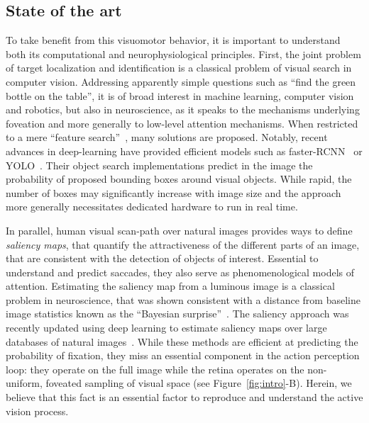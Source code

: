 %
\subsection*{State of the art}

To take benefit from this visuomotor behavior, it is important to understand both its computational and neurophysiological principles. First, the joint problem of target localization and identification is a classical problem of visual search in computer vision. Addressing apparently simple questions such as ``find the green bottle on the table'', it is of broad interest in machine learning, computer vision and robotics, but also in neuroscience, as it speaks to the mechanisms underlying foveation and more generally to low-level attention mechanisms.
When restricted to a mere ``feature search''~\cite{Treisman80}, many solutions are proposed. Notably, recent advances in deep-learning have provided efficient models such as faster-RCNN~\cite{Ren17} or YOLO~\cite{Redmon15}. 
Their object search implementations predict in the image the probability of proposed bounding boxes around visual objects. While rapid, the number of boxes may significantly increase with image size and the approach more generally necessitates dedicated hardware to run in real time. 

In parallel, human visual scan-path over natural images provides ways to define \emph{saliency maps}, that quantify the attractiveness of the different parts of an image, that are consistent with the detection of objects of interest. Essential to understand and predict saccades, they also serve as phenomenological models of attention. Estimating the saliency map from  a luminous image is a classical problem in neuroscience, that was shown consistent with a distance from baseline image statistics known as the ``Bayesian surprise''~\cite{Itti01}. The saliency approach was recently updated using deep learning to estimate saliency maps over large databases of natural images~\cite{Kummerer16}. 
While these methods are efficient at predicting the probability of fixation, they miss an essential component in the action perception loop: they operate on the full image while the retina operates on the non-uniform, foveated sampling of visual space (see Figure~\ref{fig:intro}-B). 
Herein, we believe that this fact is an essential factor to reproduce and understand the active vision process.

